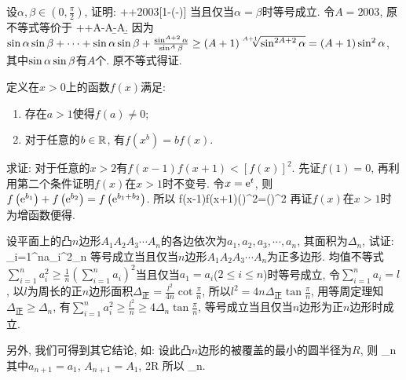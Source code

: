 \bq{}{}
设$\alpha,\beta\in\left(0,\frac{\pi}{2}\right)$, 证明: 
\bee
{}++2003[1-\cos(\alpha-\beta)]
\eee
当且仅当$\alpha=\beta$时等号成立.
\eq
\ba
令$A=2003$, 原不等式等价于
\bee
{}++A-A\cos\a\cos\b-A\sin\a\sin\b.
\eee
因为$\sin\alpha\sin\beta+\cdots+\sin\alpha\sin\beta+\frac{\sin^{A+2}\alpha}{\sin^{A}\beta}\ge(A+1)\sqrt[A+1]{\sin^{2A+2}\alpha}=(A+1)\sin^{2}\alpha$,
其中$\sin\alpha\sin\beta$有$A$个. 原不等式得证.
\ea

\bq{}{}
定义在$x>0$上的函数$f(x)$满足:
\begin{enumerate}
\item 存在$a>1$使得$f(a)\ne0$;
\item 对于任意的$b\in\mathbb{R}$, 有$f(x^{b})=bf(x)$.
\end{enumerate}
求证: 对于任意的$x>2$有$f(x-1)f(x+1)<[f(x)]^{2}.$
\eq
\ba
先证$f(1)=0$, 再利用第二个条件证明$f(x)$在$x>1$时不变号. 令$x=\mathrm{e}^{t}$, 则$f\left(\mathrm{e}^{b_{1}}\right)+f\left(\mathrm{e}^{b_{2}}\right)=f\left(\mathrm{e}^{b_{1}+b_{2}}\right)$.
所以
\bee
f(x-1)f(x+1)\le\left(\right)^{2}=\left(\right)^{2}
\eee
再证$f(x)$在$x>1$时为增函数便得.
\ea

\bq{}{}
设平面上的凸$n$边形$A_{1}A_{2}A_{3}\cdots A_{n}$的各边依次为$a_{1},a_{2},a_{3},\cdots,a_{n}$,
其面积为$\Delta_{n}$, 试证: 
\bee
\sum_{i=1}^{n}a_{i}^{2}\Delta_{n}\tan{}
\eee
等号成立当且仅当$n$边形$A_{1}A_{2}A_{3}\cdots A_{n}$为正多边形.
\eq
\ba
均值不等式$\sum_{i=1}^{n}a_{i}^{2}\ge\frac{1}{n}\left(\sum_{i=1}^{n}a_{i}\right)^{2}$当且仅当$a_{1}=a_{i}$($2\le i\le n$)时等号成立,
令$\sum_{i=1}^{n}a_{i}=l$, 以$l$为周长的正$n$边形面积$\Delta_{\text{正}}=\frac{l^{2}}{4n}\cot\frac{\pi}{n}$,
所以$l^{2}=4n\Delta_{\text{正}}\tan\frac{\pi}{n}$, 用等周定理知$\Delta_{\text{正}}\ge\Delta_{n}$,
有$\sum_{i=1}^{n}a_{i}^{2}\ge\frac{l^{2}}{n}\ge4\Delta_{n}\tan\frac{\pi}{n}$,
等号成立当且仅当$n$边形为正$n$边形时成立.

另外, 我们可得到其它结论, 如: 设此凸$n$边形的被覆盖的最小的圆半径为$R$, 则
\Delta_{n}\le{}\sum{}
\eee
其中$a_{n+1}=a_{1}$, $A_{n+1}=A_{1}$, 
\bee
2R\le\sum{}
\eee
所以
\Delta_{n}\le{}\sum{}\sum{}.
\eee
\ea

